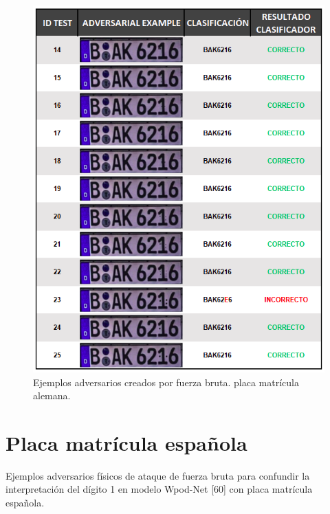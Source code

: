\begin{figure}[!h]
    \centering
    \includegraphics[scale = 0.85]{Figures/figura_68_2.PNG}
    \decoRule
    \caption[Ejemplos adversarios creados por fuerza bruta. placa matrícula alemana.
]{Ejemplos adversarios creados por fuerza bruta. placa matrícula alemana.}
    \label{fig:68_2}
\end{figure}


\section{Placa matrícula española}
Ejemplos adversarios físicos de ataque de fuerza bruta para confundir la interpretación del dígito 1 en modelo Wpod-Net [60] con placa matrícula española.

